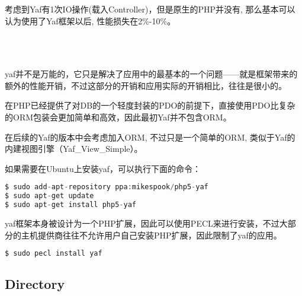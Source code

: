 考虑到Yaf有1次IO操作(载入Controller)，但是原生的PHP并没有, 那么基本可以认为使用了Yaf框架以后, 性能损失在2\%-10\%。




\begin{lstlisting}[language=PHP]

\end{lstlisting}



\begin{lstlisting}[language=PHP]

\end{lstlisting}



\begin{lstlisting}[language=PHP]

\end{lstlisting}



\begin{lstlisting}[language=PHP]

\end{lstlisting}





yaf并不是万能的，它只是解决了应用中的最基本的一个问题——就是框架带来的额外的性能开销，不过这部分的开销和应用实际的开销相比，往往是很小的。

在PHP已经提供了对DB的一个轻度封装的PDO的前提下，直接使用PDO比复杂的ORM包装会更加简单和高效，因此最初Yaf并不包含ORM。

在后续的Yaf的版本中会考虑加入ORM, 不过只是一个简单的ORM, 类似于Yaf的内建视图引擎（Yaf_View_Simple）。



如果需要在Ubuntu上安装yaf，可以执行下面的命令：


\begin{lstlisting}[language=PHP]
$ sudo add-apt-repository ppa:mikespook/php5-yaf
$ sudo apt-get update
$ sudo apt-get install php5-yaf
\end{lstlisting}

yaf框架本身被设计为一个PHP扩展，因此可以使用PECL来进行安装，不过大部分的主机提供商往往不允许用户自己安装PHP扩展，因此限制了yaf的应用。

\begin{lstlisting}[language=PHP]
$ sudo pecl install yaf
\end{lstlisting}




\subsection{Directory}


